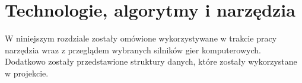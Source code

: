 \chapter{Technologie, algorytmy i narzędzia}
W niniejszym rozdziale zostały omówione wykorzystywane w trakcie pracy narzędzia wraz z przeglądem wybranych silników
gier komputerowych. Dodatkowo zostały przedstawione struktury danych, które zostały wykorzystane w projekcie.